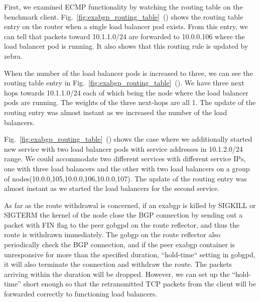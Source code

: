 First, we examined ECMP functionality by watching the routing table on the benchmark client.
Fig.~\ref{fig:exabgp_routing_table}~() shows the routing table entry on the router when a single load balancer pod exists.
From this entry, we can tell that packets toward 10.1.1.0/24 are forwarded to 10.0.0.106 where the load balancer pod is running.
It also shows that this routing rule is updated by zebra.

When the number of the load balancer pods is increased to three, we can see the routing table entry in Fig.~\ref{fig:exabgp_routing_table}~().
We have three next hops towards 10.1.1.0/24 each of which being the node where the load balancer pods are running.
The weights of the three next-hops are all 1.
The update of the routing entry was almost instant as we increased the number of the load balancers.

Fig.~\ref{fig:exabgp_routing_table}~() shows the case where we additionally started new service with two load balancer pods with service addresses in 10.1.2.0/24 range.
We could accommodate two different services with different service IPs, one with three load balancers and the other with two load balancers on a group of nodes(10.0.0,105,10.0.0,106,10.0.0,107).
The update of the routing entry was almost instant as we started the load balancers for the second service.

As far as the route withdrawal is concerned, if an exabgp is killed by SIGKILL or SIGTERM the kernel of the node close the BGP connection by sending out a packet with FIN flag to the peer gobgpd on the route reflector, and thus the route is withdrawn immediately.
The gobgp on the route reflector also periodically check the BGP connection, and if the peer exabgp container is unresponsive for more than the specified duration, “hold-time“ setting in gobgpd, it will also terminate the connection and withdraw the route.
The packets arriving within the duration will be dropped.
However, we can set up the “hold-time” short enough so that the retransmitted TCP packets from the client will be forwarded correctly to functioning load balancers.

\FloatBarrier


